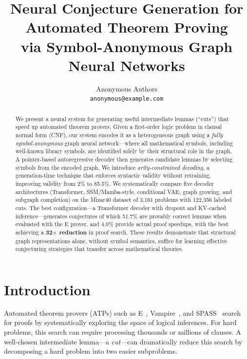 \documentclass{article}
\title{Neural Conjecture Generation for Automated Theorem Proving\\via Symbol-Anonymous Graph Neural Networks}
\author{%
  Anonymous Authors\\
  \texttt{anonymous@example.com}
}
\begin{document}
\maketitle

\begin{abstract}
We present a neural system for generating useful intermediate lemmas (``cuts'')
that speed up automated theorem provers. Given a first-order logic problem in
clausal normal form (CNF), our system encodes it as a heterogeneous graph using
a \emph{fully symbol-anonymous} graph neural network---where all mathematical
symbols, including well-known library symbols, are identified solely by their
structural role in the graph. A pointer-based autoregressive decoder then generates
candidate lemmas by selecting symbols from the encoded graph. We introduce
\emph{arity-constrained decoding}, a generation-time technique that enforces
syntactic validity without retraining, improving validity from 2\% to 85.5\%.
We systematically compare five decoder architectures (Transformer, SSM/Mamba-style,
conditional VAE, graph growing, and subgraph completion) on the Mizar40 dataset
of 3,161 problems with 122,356 labeled cuts. The best configuration---a Transformer
decoder with dropout and KV-cached inference---generates conjectures of which
51.7\% are provably correct lemmas when evaluated with the E prover, and 4.0\%
provide actual proof speedups, with the best achieving a \textbf{32$\times$ reduction}
in proof search. These results demonstrate that structural graph representations
alone, without symbol semantics, suffice for learning effective conjecturing strategies
that transfer across mathematical theories.
\end{abstract}

\section{Introduction}
\label{sec:intro}

Automated theorem provers (ATPs) such as E~\cite{schulz2002ebrainiac},
Vampire~\cite{kovacs2013vampire}, and SPASS~\cite{weidenbach2001spass}
search for proofs by systematically exploring the space of logical inferences.
For hard problems, this search can require processing thousands or millions
of clauses. A well-chosen intermediate lemma---a \emph{cut}---can dramatically
reduce this search by decomposing a hard problem into two easier subproblems.
\end{document}
